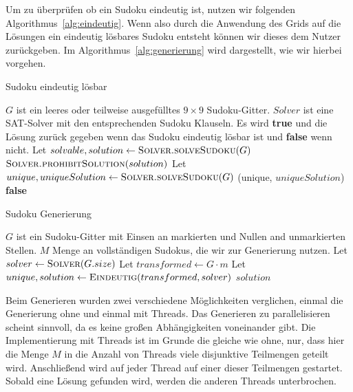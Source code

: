 Um zu überprüfen ob ein Sudoku eindeutig ist, nutzen wir folgenden Algorithmus~\ref{alg:eindeutig}. 
Wenn also durch die Anwendung des Grids auf die Lösungen ein eindeutig lösbares Sudoku entsteht können wir dieses dem Nutzer zurückgeben.
Im Algorithmus~\ref{alg:generierung} wird dargestellt, wie wir hierbei vorgehen.

\begin{algorithm}
    \caption{Sudoku eindeutig lösbar}
    \label{alg:eindeutig}
    \begin{algorithmic}[1]
        \Require $G$ ist ein leeres oder teilweise ausgefülltes $9 \times 9$ Sudoku-Gitter.
        \Require $Solver$ ist eine SAT-Solver mit den entsprechenden Sudoku Klauseln.
        \Ensure Es wird \textbf{true} und die Lösung zurück gegeben wenn das Sudoku eindeutig lösbar ist und \textbf{false} wenn nicht.
            \State Let $solvable, solution \gets \Call{Solver.solveSudoku}{G}$
                \State $\Call{Solver.prohibitSolution}{solution}$
                \State Let $unique, uniqueSolution \gets \Call{Solver.solveSudoku}{G}$
                \State \Return (unique, $uniqueSolution$)
            \Else
                \State \Return \textbf{false}
            \EndIf
        \EndFunction
    \end{algorithmic}
\end{algorithm}


\begin{algorithm}
    \caption{Sudoku Generierung}
    \label{alg:generierung}
    \begin{algorithmic}[1]
        \Require $G$ ist ein Sudoku-Gitter mit Einsen an markierten und Nullen and unmarkierten Stellen.
        \Require $M$ Menge an vollständigen Sudokus, die wir zur Generierung nutzen.
            \State Let $solver \gets \Call{Solver}{G.size}$
                \State Let $transformed \gets G \cdot m$ 
                \State Let $unique, solution \gets \Call{Eindeutig}{transformed, solver}$
                    \State \Return $solution$
                \EndIf
            \EndFor
            
        \EndFunction
    \end{algorithmic}
\end{algorithm}

Beim Generieren wurden zwei verschiedene Möglichkeiten verglichen, einmal die Generierung ohne und einmal mit Threads. 
Das Generieren zu parallelisieren scheint sinnvoll, da es keine großen Abhängigkeiten voneinander gibt.
Die Implementierung mit Threads ist im Grunde die gleiche wie ohne, nur, dass hier die Menge $M$ in die Anzahl von Threads viele disjunktive Teilmengen geteilt wird.
Anschließend wird auf jeder Thread auf einer dieser Teilmengen gestartet. Sobald eine Lösung gefunden wird, werden die anderen Threads unterbrochen.